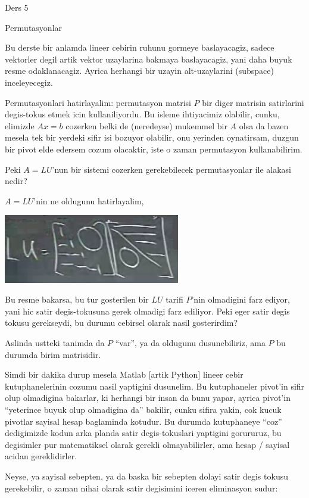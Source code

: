 \documentclass[12pt,fleqn]{article}\usepackage{../common}
\begin{document}
Ders 5

Permutasyonlar

Bu derste bir anlamda lineer cebirin ruhunu gormeye baslayacagiz, sadece
vektorler degil artik vektor uzaylarina bakmaya baslayacagiz, yani daha
buyuk resme odaklanacagiz. Ayrica herhangi bir uzayin alt-uzaylarini
(subspace) inceleyecegiz. 

Permutasyonlari hatirlayalim: permutasyon matrisi $P$ bir diger matrisin
satirlarini degis-tokus etmek icin kullaniliyordu. Bu isleme ihtiyacimiz
olabilir, cunku, elimizde $Ax=b$ cozerken belki de (neredeyse) mukemmel bir
$A$ olsa da bazen mesela tek bir yerdeki sifir isi bozuyor olabilir, onu
yerinden oynatirsam, duzgun bir pivot elde edersem cozum olacaktir, iste o
zaman permutasyon kullanabilirim.

Peki $A=LU$'nun bir sistemi cozerken gerekebilecek permutasyonlar ile
alakasi nedir?

$A=LU$'nin ne oldugunu hatirlayalim, 

\includegraphics[height=3cm]{5_01.png}

Bu resme bakarsa, bu tur gosterilen bir $LU$ tarifi $P$'nin olmadigini
farz ediyor, yani hic satir degis-tokusuna gerek olmadigi farz
ediliyor. Peki eger satir degis tokusu gerekseydi, bu durumu cebirsel
olarak nasil gosterirdim?

Aslinda ustteki tanimda da $P$ ``var'', ya da oldugunu dusunebiliriz, ama
$P$ bu durumda birim matrisidir. 

Simdi bir dakika durup mesela Matlab [artik Python] lineer cebir
kutuphanelerinin cozumu nasil yaptigini dusunelim. Bu kutuphaneler pivot'in
sifir olup olmadigina bakarlar, ki herhangi bir insan da bunu yapar, ayrica
pivot'in ``yeterince buyuk olup olmadigina da'' bakilir, cunku sifira
yakin, cok kucuk pivotlar sayisal hesap baglaminda kotudur. Bu durumda
kutuphaneye ``coz'' dedigimizde kodun arka planda satir degis-tokuslari
yaptigini gorururuz, bu degisimler pur matematiksel olarak gerekli
olmayabilirler, ama hesap / sayisal acidan gereklidirler. 

Neyse, ya sayisal sebepten, ya da baska bir sebepten dolayi satir degis
tokusu gerekebilir, o zaman nihai olarak satir degisimini iceren
eliminasyon sudur:
\end{document}
